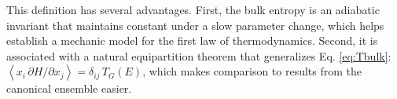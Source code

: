 \documentclass[preprint]{revtex4-1}
\begin{document}
%
%
%

This definition has several advantages.
%
First, the bulk entropy is an adiabatic invariant\cite{gibbs,
  hertz1910a, *hertz1910b, munster, becker, cagin1988, rugh2001, adib2002, dunkel2014}
  that maintains constant
  under a slow parameter change,
%
which helps establish a mechanic model
for the first law of thermodynamics.
%
Second, it is associated with a natural equipartition theorem\cite{
  khinchin, dunkel2014}
  that generalizes Eq. \eqref{eq:Tbulk}:
$\left\langle x_i \, \partial H/\partial x_j \right\rangle = \delta_{ij} \, T_G(E)$,
which makes comparison to results from the canonical ensemble easier.
\end{document}
